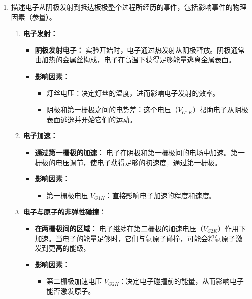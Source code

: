 \documentclass[dvipsnames, svgnames,a4paper,11pt]{article}
\begin{document}
\begin{enumerate}
\begin{enumerate}
			\item \textbf{实验结果与波谱验证：}
			\begin{itemize}
				\item 实验得到的第一激发电势能可通过发光光谱进一步验证。这个验证过程包括选择适当的光谱仪频段来观测由原子退激发时发出的光。
			\end{itemize}
		\end{enumerate}
		
		\item 描述电子从阴极发射到抵达板极整个过程所经历的事件，包括影响事件的物理因素（参量）。
		\begin{enumerate}
			\item \textbf{电子发射：}
			\begin{itemize}
				\item \textbf{阴极发射电子：} 实验开始时，电子通过热发射从阴极释放。阴极通常由加热的金属丝构成，电子在高温下获得足够能量逃离金属表面。
				\item \textbf{影响因素：}
				\begin{itemize}
					\item 灯丝电压：决定灯丝的温度，进而影响电子发射的效率。
					\item 阴极和第一栅极之间的电势差：这个电压（\( V_{G1K} \)）帮助电子从阴极表面逃逸并开始它们的运动。
				\end{itemize}
			\end{itemize}
			
			\item \textbf{电子加速：}
			\begin{itemize}
				\item \textbf{通过第一栅极的加速：} 电子在阴极和第一栅极间的电场中加速。第一栅极的电压调节，使电子获得足够的初速度，通过第一栅极。
				\item \textbf{影响因素：}
				\begin{itemize}
					\item 第一栅极电压 \( V_{G1K} \)：直接影响电子加速的程度和速度。
				\end{itemize}
			\end{itemize}
			
			\item \textbf{电子与原子的非弹性碰撞：}
			\begin{itemize}
				\item \textbf{在两栅极间的区域：} 电子继续在第二栅极的加速电压（\( V_{G2K} \)）作用下加速。当电子的能量足够时，它们与氩原子碰撞，可能会将氩原子激发到更高的能级。
				\item \textbf{影响因素：}
				\begin{itemize}
					\item 第二栅极加速电压 \( V_{G2K} \)：决定电子碰撞前的能量，从而影响电子能否激发原子。
					

\end{itemize}
\end{itemize}
\end{enumerate}
\end{enumerate}
\end{document}
